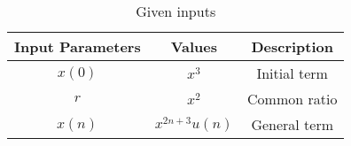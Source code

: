 \begin{table}[htbp]
\centering
\def\arraystrech{1.5}
	\begin{tabular}{|c|c|c|}
\hline
		\textbf{Input Parameters} & \textbf{Values} & \textbf{Description} \\
\hline
		$x(0)$ & $x^3$ & Initial term\\
\hline
		$r$ & $x^2$ & Common ratio\\
\hline
		$x(n)$ & $x^{2n+3}u(n)$ & General term \\
\hline
\end{tabular}
\caption{Given inputs}
\label{tab:1.11.9.3.Q10}
\end{table}
